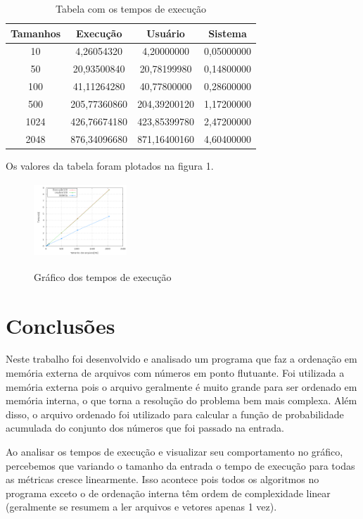 \documentclass[12pt]{article}
\begin{document}
\begin{table}[htb]
\centering
\caption{Tabela com os tempos de execução}
\label{tempossss}
\begin{tabular}{|c|c|c|c|}
\hline Tamanhos & Execução & Usuário & Sistema \\ 
\hline 10 & 4,26054320
 & 4,20000000
 & 0,05000000
 \\ 
\hline 50 & 20,93500840
 & 20,78199980
 & 0,14800000
 \\ 
\hline 100 & 41,11264280
 & 40,77800000
 & 0,28600000
 \\ 
\hline 500 & 205,77360860
 & 204,39200120
 & 1,17200000
 \\ 
\hline 1024 & 426,76674180
 & 423,85399780
 & 2,47200000
 \\ 
\hline 2048 & 876,34096680
 & 871,16400160
 & 4,60400000
 \\ 
\hline
\end{tabular} 
\end{table}

Os valores da tabela foram plotados na figura 1.

\begin{figure}[ht!]
\centering
\includegraphics[width=3.5cm,height=2.8cm]{avaliacoes/testes.png}
\label{img:resss}
\caption{Gráfico dos tempos de execução}
\end{figure}

\section{Conclusões}
\label{conclusao}

Neste trabalho foi desenvolvido e analisado um programa que faz a ordenação em memória 
externa de arquivos com números em ponto flutuante. Foi utilizada a memória externa pois o arquivo
geralmente é muito grande para ser ordenado em memória interna, o que torna a resolução do problema
bem mais complexa. Além disso, o arquivo ordenado foi utilizado para calcular a função de probabilidade acumulada do conjunto dos números que foi passado na entrada.

Ao analisar os tempos de execução e visualizar seu comportamento no gráfico, percebemos que variando
o tamanho da entrada o tempo de execução para todas as métricas cresce linearmente. Isso acontece pois
 todos os algoritmos no programa exceto o de ordenação interna têm ordem de complexidade linear (geralmente se resumem a ler arquivos e vetores apenas 1 vez). 
 
\end{document}
